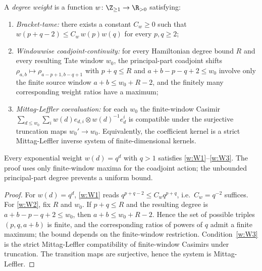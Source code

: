 \begin{defn}\label{defn:wt-degree-weight}
  A \emph{degree weight} is a function $w\colon\Z_{\geq1}\to\R_{>0}$
  satisfying:
  \begin{enumerate}[label=(W\arabic*)]
    \item\label{w:W1} \emph{Bracket-tame:} there exists a constant
      $C_w\geq 0$ such that
      $w(p+q-2)\leq C_w\,w(p)w(q)$ for every $p,q\geq2$;
    \item\label{w:W2} \emph{Windowwise coadjoint-continuity:} for every
      Hamiltonian degree bound $R$ and every resulting Tate window
      $w_0$, the principal-part coadjoint shifts
      $\rho_{a,b}\mapsto\rho_{a-p+1,b-q+1}$ with $p+q\leq R$ and
      $a+b-p-q+2\leq w_0$ involve only the finite source window
      $a+b\leq w_0+R-2$, and the finitely many corresponding weight
      ratios have a maximum;
    \item\label{w:W3} \emph{Mittag-Leffler coevaluation:} for each
      $w_0$ the finite-window Casimir
      $\sum_{d\leq w_0}\sum_i w(d)e_{d,i}\otimes w(d)^{-1}e^i_d$
      is compatible under the surjective truncation maps
      $w_0'\to w_0$. Equivalently, the coefficient kernel is a strict
      Mittag-Leffler inverse system of finite-dimensional kernels.
  \end{enumerate}
\end{defn}

\begin{lem}\label{lem:wt-weights-exist}
  Every exponential weight $w(d)=q^d$ with $q>1$ satisfies
  \ref{w:W1}--\ref{w:W3}.  The proof uses only finite-window maxima
  for the coadjoint action; the unbounded principal-part degree prevents
  a uniform bound.
\end{lem}

\begin{proof}
  For $w(d)=q^d$, \ref{w:W1} reads $q^{p+q-2}\leq C_w q^{p+q}$, i.e.\
  $C_w=q^{-2}$ suffices.  For \ref{w:W2}, fix $R$ and $w_0$.  If
  $p+q\leq R$ and the resulting degree is
  $a+b-p-q+2\leq w_0$, then $a+b\leq w_0+R-2$.  Hence the set of
  possible triples $(p,q,a+b)$ is finite, and the corresponding
  ratios of powers of $q$ admit a finite maximum; the bound depends on
  the finite-window restriction.
  Condition~\ref{w:W3} is the strict Mittag-Leffler compatibility of
  finite-window Casimirs under truncation.  The transition maps are
  surjective, hence the system is Mittag-Leffler.
\end{proof}

